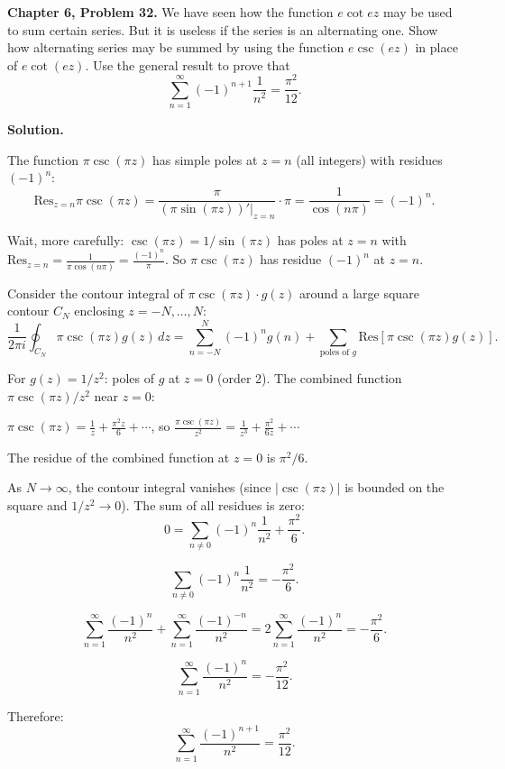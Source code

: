 \documentclass[12pt]{article}
\begin{document}
\textbf{Chapter 6, Problem 32.} We have seen how the function $e\cot ez$ may be used to sum certain series. But it is useless if the series is an alternating one. Show how alternating series may be summed by using the function $e\csc(ez)$ in place of $e\cot(ez)$. Use the general result to prove that
\[
\sum_{n=1}^{\infty}(-1)^{n+1}\frac{1}{n^2} = \frac{\pi^2}{12}.
\]

\bigskip
\textbf{Solution.}

The function $\pi\csc(\pi z)$ has simple poles at $z = n$ (all integers) with residues $(-1)^n$:
\[
\text{Res}_{z=n}\pi\csc(\pi z) = \frac{\pi}{(\pi\sin(\pi z))'|_{z=n}} \cdot \pi = \frac{1}{\cos(n\pi)} = (-1)^n.
\]

Wait, more carefully: $\csc(\pi z) = 1/\sin(\pi z)$ has poles at $z = n$ with $\text{Res}_{z=n} = \frac{1}{\pi\cos(n\pi)} = \frac{(-1)^n}{\pi}$. So $\pi\csc(\pi z)$ has residue $(-1)^n$ at $z = n$.

Consider the contour integral of $\pi\csc(\pi z)\cdot g(z)$ around a large square contour $C_N$ enclosing $z = -N, \ldots, N$:
\[
\frac{1}{2\pi i}\oint_{C_N}\pi\csc(\pi z)g(z)\,dz = \sum_{n=-N}^{N}(-1)^n g(n) + \sum_{\text{poles of }g}\text{Res}[\pi\csc(\pi z)g(z)].
\]

For $g(z) = 1/z^2$: poles of $g$ at $z = 0$ (order 2). The combined function $\pi\csc(\pi z)/z^2$ near $z = 0$:

$\pi\csc(\pi z) = \frac{1}{z} + \frac{\pi^2 z}{6} + \cdots$, so $\frac{\pi\csc(\pi z)}{z^2} = \frac{1}{z^3} + \frac{\pi^2}{6z} + \cdots$

The residue of the combined function at $z = 0$ is $\pi^2/6$.

As $N \to \infty$, the contour integral vanishes (since $|\csc(\pi z)|$ is bounded on the square and $1/z^2 \to 0$). The sum of all residues is zero:
\[
0 = \sum_{n\neq 0}(-1)^n \frac{1}{n^2} + \frac{\pi^2}{6}.
\]

\[
\sum_{n\neq 0}(-1)^n\frac{1}{n^2} = -\frac{\pi^2}{6}.
\]

\[
\sum_{n=1}^{\infty}\frac{(-1)^n}{n^2} + \sum_{n=1}^{\infty}\frac{(-1)^{-n}}{n^2} = 2\sum_{n=1}^{\infty}\frac{(-1)^n}{n^2} = -\frac{\pi^2}{6}.
\]

\[
\sum_{n=1}^{\infty}\frac{(-1)^n}{n^2} = -\frac{\pi^2}{12}.
\]

Therefore:
\[
\boxed{\sum_{n=1}^{\infty}\frac{(-1)^{n+1}}{n^2} = \frac{\pi^2}{12}.}
\]
\end{document}
